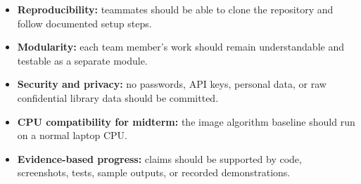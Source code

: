 \begin{itemize}
  \item \textbf{Reproducibility:} teammates should be able to clone the repository and follow documented setup steps.
  \item \textbf{Modularity:} each team member's work should remain understandable and testable as a separate module.
  \item \textbf{Security and privacy:} no passwords, API keys, personal data, or raw confidential library data should be committed.
  \item \textbf{CPU compatibility for midterm:} the image algorithm baseline should run on a normal laptop CPU.
  \item \textbf{Evidence-based progress:} claims should be supported by code, screenshots, tests, sample outputs, or recorded demonstrations.
\end{itemize}
